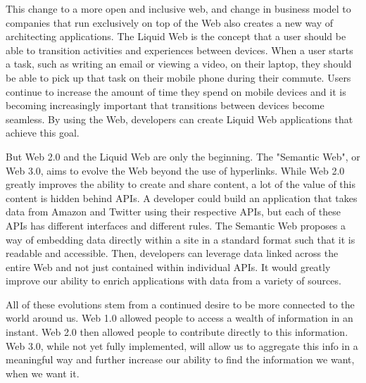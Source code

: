 \documentclass[12pt]{article}
\begin{document}
This change to a more open and inclusive web, and change in business model to companies that run exclusively on top of the Web also creates a new way of architecting applications.  The Liquid Web is the concept that a user should be able to transition activities and experiences between devices.  When a user starts a task, such as writing an email or viewing a video, on their laptop, they should be able to pick up that task on their mobile phone during their commute.  Users continue to increase the amount of time they spend on mobile devices and it is becoming increasingly important that transitions between devices become seamless.  By using the Web, developers can create Liquid Web applications that achieve this goal.

But Web 2.0 and the Liquid Web are only the beginning.  The "Semantic Web", or Web 3.0, aims to evolve the Web beyond the use of hyperlinks.  While Web 2.0 greatly improves the ability to create and share content, a lot of the value of this content is hidden behind APIs.  A developer could build an application that takes data from Amazon and Twitter using their respective APIs, but each of these APIs has different interfaces and different rules.  The Semantic Web proposes a way of embedding data directly within a site in a standard format such that it is readable and accessible.  Then, developers can leverage data linked across the entire Web and not just contained within individual APIs.  It would greatly improve our ability to enrich applications with data from a variety of sources.

All of these evolutions stem from a continued desire to be more connected to the world around us.  Web 1.0 allowed people to access a wealth of information in an instant.  Web 2.0 then allowed people to contribute directly to this information.  Web 3.0, while not yet fully implemented, will allow us to aggregate this info in a meaningful way and further increase our ability to find the information we want, when we want it.

\clearpage
{}

\end{document}
